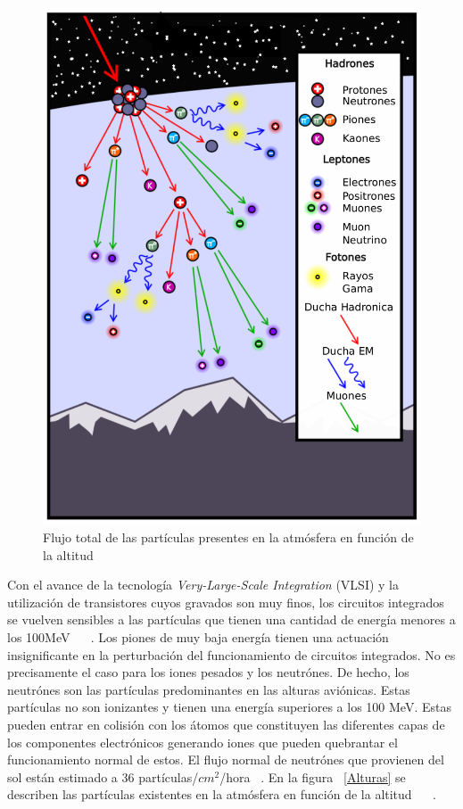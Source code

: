 \documentclass[a4paper,openright,12pt]{report}
\begin{document}
\begin{figure}[H]
	\centering
	\includegraphics[width=0.5 \textwidth]{img/DuchaSuper.pdf}
	\caption{Flujo total de las partículas  presentes en la atmósfera en función de la altitud  }
	\label{Ducha}
\end{figure}

Con el avance de la tecnología \textit{Very-Large-Scale Integration} (VLSI) y la utilización de transistores cuyos gravados son muy finos, los circuitos integrados se vuelven sensibles a las partículas que tienen una cantidad de energía menores a los 100MeV ~\cite{taber1995}
~\cite{taber1993single}. Los piones de muy baja energía tienen una actuación insignificante en la perturbación del funcionamiento de circuitos integrados. No es precisamente el caso para los iones pesados y los neutrónes. De hecho, los neutrónes son las partículas predominantes en las alturas aviónicas. Estas partículas no son ionizantes y tienen una energía superiores a los 100 MeV. Estas pueden entrar en colisión con los átomos que constituyen las diferentes capas de los componentes electrónicos generando iones que pueden quebrantar el funcionamiento normal de estos. El flujo normal de neutrónes que provienen del sol están estimado a 36 partículas/$cm^2$/hora ~\cite{standard2001measurement}. En la  figura ~\ref{Alturas} se describen las partículas existentes en la atmósfera en función de la altitud ~\cite{o1971natural} ~\cite{o1978luin}. 
\end{document}
